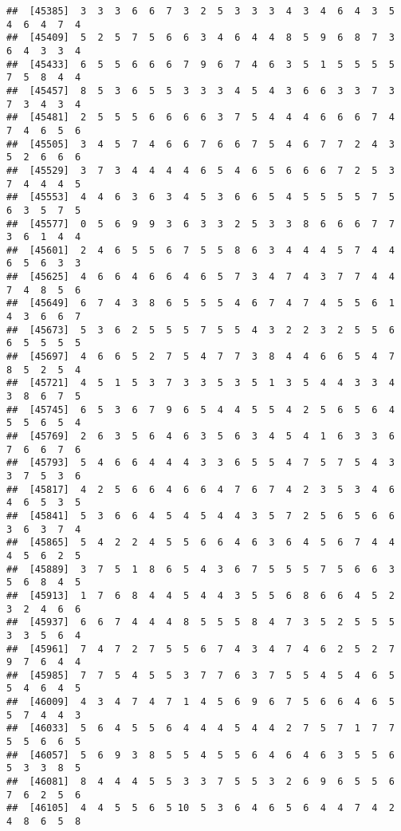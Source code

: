 \documentclass[
]{book}
\begin{document}
\begin{verbatim}
##  [45385]  3  3  3  6  6  7  3  2  5  3  3  3  4  3  4  6  4  3  5  4  6  4  7  4
##  [45409]  5  2  5  7  5  6  6  3  4  6  4  4  8  5  9  6  8  7  3  6  4  3  3  4
##  [45433]  6  5  5  6  6  6  7  9  6  7  4  6  3  5  1  5  5  5  5  7  5  8  4  4
##  [45457]  8  5  3  6  5  5  3  3  3  4  5  4  3  6  6  3  3  7  3  7  3  4  3  4
##  [45481]  2  5  5  5  6  6  6  6  3  7  5  4  4  4  6  6  6  7  4  7  4  6  5  6
##  [45505]  3  4  5  7  4  6  6  7  6  6  7  5  4  6  7  7  2  4  3  5  2  6  6  6
##  [45529]  3  7  3  4  4  4  4  6  5  4  6  5  6  6  6  7  2  5  3  7  4  4  4  5
##  [45553]  4  4  6  3  6  3  4  5  3  6  6  5  4  5  5  5  5  7  5  6  3  5  7  5
##  [45577]  0  5  6  9  9  3  6  3  3  2  5  3  3  8  6  6  6  7  7  3  6  1  4  4
##  [45601]  2  4  6  5  5  6  7  5  5  8  6  3  4  4  4  5  7  4  4  6  5  6  3  3
##  [45625]  4  6  6  4  6  6  4  6  5  7  3  4  7  4  3  7  7  4  4  7  4  8  5  6
##  [45649]  6  7  4  3  8  6  5  5  5  4  6  7  4  7  4  5  5  6  1  4  3  6  6  7
##  [45673]  5  3  6  2  5  5  5  7  5  5  4  3  2  2  3  2  5  5  6  6  5  5  5  5
##  [45697]  4  6  6  5  2  7  5  4  7  7  3  8  4  4  6  6  5  4  7  8  5  2  5  4
##  [45721]  4  5  1  5  3  7  3  3  5  3  5  1  3  5  4  4  3  3  4  3  8  6  7  5
##  [45745]  6  5  3  6  7  9  6  5  4  4  5  5  4  2  5  6  5  6  4  5  5  6  5  4
##  [45769]  2  6  3  5  6  4  6  3  5  6  3  4  5  4  1  6  3  3  6  7  6  6  7  6
##  [45793]  5  4  6  6  4  4  4  3  3  6  5  5  4  7  5  7  5  4  3  3  7  5  3  6
##  [45817]  4  2  5  6  6  4  6  6  4  7  6  7  4  2  3  5  3  4  6  4  6  5  3  5
##  [45841]  5  3  6  6  4  5  4  5  4  4  3  5  7  2  5  6  5  6  6  3  6  3  7  4
##  [45865]  5  4  2  2  4  5  5  6  6  4  6  3  6  4  5  6  7  4  4  4  5  6  2  5
##  [45889]  3  7  5  1  8  6  5  4  3  6  7  5  5  5  7  5  6  6  3  5  6  8  4  5
##  [45913]  1  7  6  8  4  4  5  4  4  3  5  5  6  8  6  6  4  5  2  3  2  4  6  6
##  [45937]  6  6  7  4  4  4  8  5  5  5  8  4  7  3  5  2  5  5  5  3  3  5  6  4
##  [45961]  7  4  7  2  7  5  5  6  7  4  3  4  7  4  6  2  5  2  7  9  7  6  4  4
##  [45985]  7  7  5  4  5  5  3  7  7  6  3  7  5  5  4  5  4  6  5  5  4  6  4  5
##  [46009]  4  3  4  7  4  7  1  4  5  6  9  6  7  5  6  6  4  6  5  5  7  4  4  3
##  [46033]  5  6  4  5  5  6  4  4  4  5  4  4  2  7  5  7  1  7  7  5  5  6  6  5
##  [46057]  5  6  9  3  8  5  5  4  5  5  6  4  6  4  6  3  5  5  6  5  3  3  8  5
##  [46081]  8  4  4  4  5  5  3  3  7  5  5  3  2  6  9  6  5  5  6  7  6  2  5  6
##  [46105]  4  4  5  5  6  5 10  5  3  6  4  6  5  6  4  4  7  4  2  4  8  6  5  8

\end{verbatim}
\end{document}
